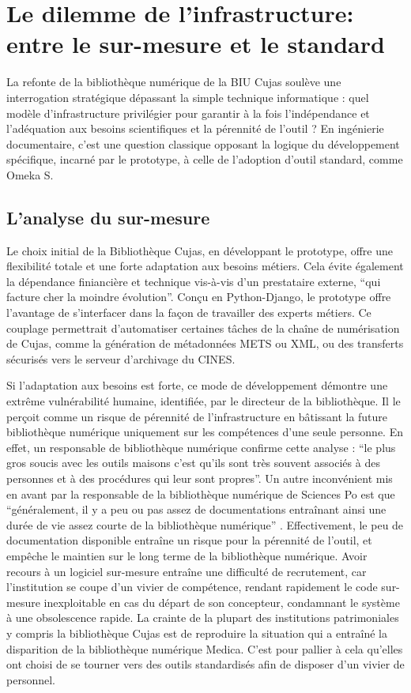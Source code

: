 \section[Dilemme de l'infrastructure]{Le dilemme de l'infrastructure: entre le sur-mesure et le standard}
La refonte de la bibliothèque numérique de la \ac{BIU Cujas} soulève une interrogation stratégique dépassant la simple technique informatique : quel modèle d'infrastructure privilégier pour garantir à la fois l'indépendance et l'adéquation aux besoins scientifiques et la pérennité de l'outil ? En ingénierie documentaire, c'est une question classique opposant la logique du développement spécifique, incarné par le prototype, à celle de l'adoption d'outil standard, comme Omeka S.

\subsection{L'analyse du sur-mesure}
Le choix initial de la Bibliothèque Cujas, en développant le prototype, offre une flexibilité totale et une forte adaptation aux besoins métiers. Cela évite également la dépendance finiancière et technique vis-à-vis d'un prestataire externe, \enquote{qui facture cher la moindre évolution}. Conçu en Python-Django, le prototype offre l'avantage de s'interfacer dans la façon de travailler des experts métiers. Ce couplage permettrait  d'automatiser certaines tâches de la chaîne de numérisation de Cujas, comme la génération de métadonnées \ac{METS} ou \ac{XML}, ou des transferts sécurisés vers le serveur d'archivage du \ac{CINES}.

Si l'adaptation aux besoins est forte, ce mode de développement démontre une extrême vulnérabilité humaine, identifiée, par le directeur de la bibliothèque. Il le perçoit comme un risque de pérennité de l'infrastructure en bâtissant la future bibliothèque numérique uniquement sur les compétences d'une seule personne. En effet, un responsable de bibliothèque numérique confirme cette analyse : \enquote{le plus gros soucis avec les outils maisons c'est qu'ils sont très souvent associés à des personnes et à des procédures qui leur sont propres}. Un autre inconvénient mis en avant par la responsable de la bibliothèque numérique de Sciences Po est que \enquote{généralement, il y a peu ou pas assez de documentations entraînant ainsi une durée de vie assez courte de la bibliothèque numérique} . Effectivement, le peu de documentation disponible entraîne un risque pour la pérennité de l'outil, et empêche le maintien sur le long terme de la bibliothèque numérique. Avoir recours à un logiciel sur-mesure entraîne une difficulté de recrutement, car l'institution se coupe d'un vivier de compétence, rendant rapidement le code sur-mesure inexploitable en cas du départ de son concepteur, condamnant le système à une obsolescence rapide. La crainte de la plupart des institutions patrimoniales y compris la bibliothèque Cujas est de reproduire la situation qui a entraîné la disparition de la bibliothèque numérique Medica. C'est pour pallier à cela qu'elles ont choisi de se tourner vers des outils standardisés afin de disposer d'un vivier de personnel.

